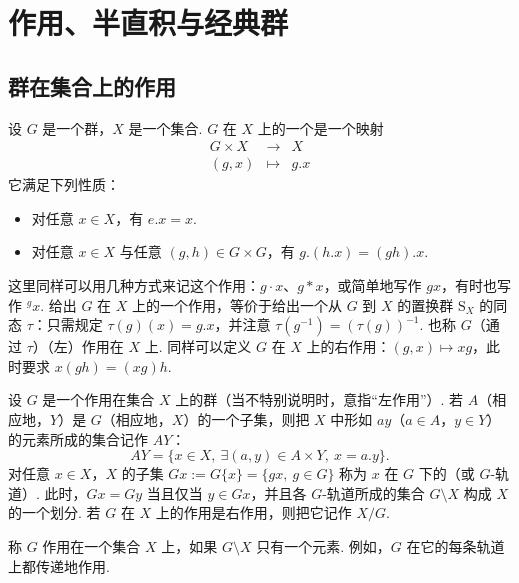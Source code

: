 \chapter{作用、半直积与经典群}\label{chap:fg-2}
\section{群在集合上的作用}\label{sec:fg-2-1}
\begin{definition}\label{def:fg-2-1-1}
设 $G$ 是一个群，$X$ 是一个集合. $G$ 在 $X$ 上的一个是一个映射
\[
\begin{array}{rcl}
G\times X &\longrightarrow& X\\
(g,x) &\longmapsto& g.x
\end{array}
\]
它满足下列性质：
\begin{itemize}
\item 对任意 $x\in X$，有 $e.x=x$.
\item 对任意 $x\in X$ 与任意 $(g,h)\in G\times G$，有 $g.(h.x)=(gh).x$.
\end{itemize}
\end{definition}
这里同样可以用几种方式来记这个作用：$g\cdot x$、$g*x$，或简单地写作 $gx$，有时也写作 ${}^{g}x$. 给出 $G$ 在 $X$ 上的一个作用，等价于给出一个从 $G$ 到 $X$ 的置换群 $\mathrm{S}_X$ 的同态 $\tau$：只需规定 $\tau(g)(x)=g.x$，并注意 $\tau(g^{-1})=(\tau(g))^{-1}$. 也称 $G$（通过 $\tau$）（左）作用在 $X$ 上. 同样可以定义 $G$ 在 $X$ 上的右作用：$(g,x)\mapsto xg$，此时要求 $x(gh)=(xg)h$.
\begin{numpara}[轨道]\label{np:fg-2-1-2}
设 $G$ 是一个作用在集合 $X$ 上的群（当不特别说明时，意指``左作用''）. 若 $A$（相应地，$Y$）是 $G$（相应地，$X$）的一个子集，则把 $X$ 中形如 $ay$（$a\in A$，$y\in Y$）的元素所成的集合记作 $AY$：
\[
AY=\{x\in X,\ \exists(a,y)\in A\times Y,\ x=a.y\}.
\]
对任意 $x\in X$，$X$ 的子集 $Gx:=G\{x\}=\{gx,\ g\in G\}$ 称为 $x$ 在 $G$ 下的（或 $G$-轨道）. 此时，$Gx=Gy$ 当且仅当 $y\in Gx$，并且各 $G$-轨道所成的集合 $G\setminus X$ 构成 $X$ 的一个划分. 若 $G$ 在 $X$ 上的作用是右作用，则把它记作 $X/G$.
\end{numpara}
称 $G$ 作用在一个集合 $X$ 上，如果 $G\setminus X$ 只有一个元素. 例如，$G$ 在它的每条轨道上都传递地作用.
